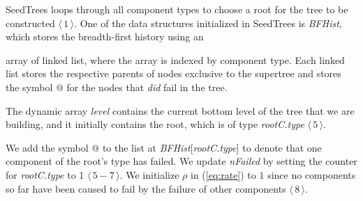 \documentclass[12pt]{article}
\def\myxout{\bgroup \markoverwith{\textcolor{red}{\hbox to.35em{\hss/\hss}}}\ULon}
\newcommand{\deleted}[1]{}
\newcommand{\changed}[1]{#1}
\newcommand{\changed}[1]{\textcolor{red}{#1}}
\newcommand{\deleted}[1]{{\myxout{#1}}}
\newcommand{\varName}[1]{\textrm{\it#1}}
\newcommand{\citeLine}[1]{$\langle \, #1 \, \rangle$}
\newcommand{\citeBlock}[2]{$\langle \, #1 - #2 \, \rangle$}
\begin{document}
\deleted{The data structure $\Gamma$ consists of $(\Gamma_i : i \in \Omega)$. We start by iterating through $\Omega$ to choose a root component with type \varName{rootC.type} for an initial tree with one node \citeLine{1}. We then initialize the following data structures \citeBlock{2}{4}:}
\deleted{
\\
$\bullet$
\varName{level}, a dynamic array to hold the failed nodes in the current bottom level of the tree (in breadth-first order);}
\deleted{
\\
$\bullet$
\varName{nFailed}, an array that counts the number of failed components of each type in the tree; and }
\deleted{
\\
$\bullet$
\varName{BFHist}, a data structure that is the breadth-first history of a tree.
\\
} %
\changed{SeedTrees loops through all
component types to choose a root for
the tree to be constructed \citeLine{1}.
One of the data structures initialized
in SeedTrees is \varName{BFHist}, which
stores the breadth-first history using an}
\deleted{\varName{BFHist} is implemented as an}
array of linked list, where the array is indexed by component type. Each linked list stores the respective parents of nodes exclusive to the supertree and stores the symbol @ for the nodes that \textit{did} fail in the tree.
\deleted{To determine the number of components available of a certain type, we first consider a CTMC transition $(x, y)$ corresponding to the tree we are building, where we call $x$ the from-state and $y$ the to-state in the transition. Then the number of available components of a type $i$ is computed as $r_i - n_i(x) - \mbox{\textit{nFailed}}[i]$, where $n_i(x)$ is the number failed of type $i$ in state $x$, and $\mbox{\textit{nFailed}}[i]$ is the number failed of type $i$ in the tree thus far in breadth-first order $\langle 2-4 \rangle$.}

\changed{The dynamic array
\varName{level} contains the current
bottom level of the tree that we are
building, and it initially contains
the root, which is of type
\varName{rootC.type}
\citeLine{5}.}
\deleted{Since the root must fail, we initialize \varName{level} with \varName{rootC.type}.}
We add the symbol @ to the list at \varName{BFHist}[\varName{rootC.type}] to denote that one component of the root's type has failed. We update \varName{nFailed} by setting the counter for \varName{rootC.type} to 1 \citeBlock{5}{7}.
\changed{We initialize $\rho$
in (\ref{eq:rate}) to $1$
since
no components so far have been caused to
fail by the failure of other components
\citeLine{8}.}
\end{document}
